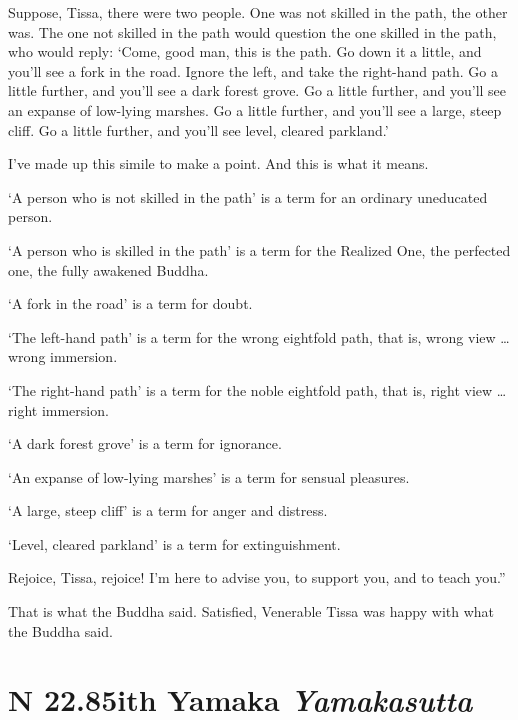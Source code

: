 \documentclass[12pt,openany]{book}%
\newcommand*{\suttatitleacronym}[1]{\smaller[2]{#1}\vspace*{.3em}}
\newcommand*{\suttatitletranslation}[1]{\linebreak{#1}}
\newcommand*{\suttatitleroot}[1]{\linebreak\smaller[2]\itshape{#1}}
\newcommand*{\tocacronym}[1]{\hspace*{-3.3em}{#1}\quad}
\newcommand*{\toctranslation}[1]{#1}
\newcommand*{\tocroot}[1]{(\textit{#1})}
\begin{document}
Suppose, Tissa, there were two people. One was not skilled in the path, the other was. The one not skilled in the path would question the one skilled in the path, who would reply: ‘Come, good man, this is the path. Go down it a little, and you’ll see a fork in the road. Ignore the left, and take the right-hand path. Go a little further, and you’ll see a dark forest grove. Go a little further, and you’ll see an expanse of low-lying marshes. Go a little further, and you’ll see a large, steep cliff. Go a little further, and you’ll see level, cleared parkland.’ 

I’ve made up this simile to make a point. And this is what it means. 

‘A person who is not skilled in the path’ is a term for an ordinary uneducated person. 

‘A person who is skilled in the path’ is a term for the Realized One, the perfected one, the fully awakened Buddha. 

‘A fork in the road’ is a term for doubt. 

‘The left-hand path’ is a term for the wrong eightfold path, that is, wrong view … wrong immersion. 

‘The right-hand path’ is a term for the noble eightfold path, that is, right view … right immersion. 

‘A dark forest grove’ is a term for ignorance. 

‘An expanse of low-lying marshes’ is a term for sensual pleasures. 

‘A large, steep cliff’ is a term for anger and distress. 

‘Level, cleared parkland’ is a term for extinguishment. 

Rejoice, Tissa, rejoice! I’m here to advise you, to support you, and to teach you.” 

That is what the Buddha said. Satisfied, Venerable Tissa was happy with what the Buddha said. 

%
\section*{{\suttatitleacronym SN 22.85}{\suttatitletranslation With Yamaka }{\suttatitleroot Yamakasutta}}
\addcontentsline{toc}{section}{\tocacronym{SN 22.85} \toctranslation{With Yamaka } \tocroot{Yamakasutta}}
\end{document}
